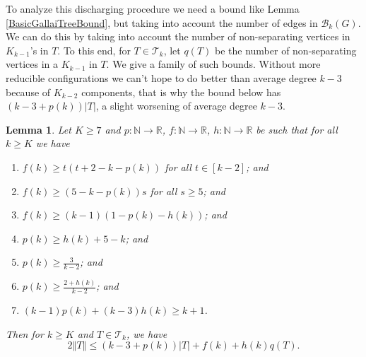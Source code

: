 \documentclass[12pt]{article}
\theoremstyle{plain}
\newtheorem{lem}[thm]{Lemma}
\theoremstyle{definition}
\theoremstyle{remark}
\newcommand{\fancy}[1]{\mathcal{#1}}
\newcommand{\IN}{\mathbb{N}}
\newcommand{\IR}{\mathbb{R}}
\newcommand{\T}{\fancy{T}}
\newcommand{\B}{\fancy{B}}
\newcommand{\card}[1]{\left|#1\right|}
\newcommand{\size}[1]{\left\Vert#1\right\Vert}
\newcommand{\func}[3]{#1\colon #2 \rightarrow #3}
\newcommand{\irange}[1]{\left[#1\right]}
\begin{document}
To analyze this discharging procedure we need a bound like Lemma \ref{BasicGallaiTreeBound}, but taking into account the number of edges in $\B_k(G)$.  We can do this by taking into account the number of non-separating vertices in $K_{k-1}$'s in $T$.  To this end, for $T \in \T_k$, let $q(T)$ be the number of non-separating vertices in a $K_{k-1}$ in $T$.  We give a family of such bounds.  Without more reducible configurations we can't hope to do better than average degree $k-3$ because of $K_{k-2}$ components, that is why the bound below has $(k-3 + p(k))|T|$, a slight worsening of average degree $k-3$.

\begin{lem}\label{BoundFamily}
	Let $K \ge 7$ and $\func{p}{\IN}{\IR}$, $\func{f}{\IN}{\IR}$, $\func{h}{\IN}{\IR}$ be such that for all $k \ge K$ we have
	\begin{enumerate}
		\item $f(k) \ge t(t+2-k-p(k))$ for all $t \in \irange{k-2}$; and
    	\item $f(k) \ge (5-k-p(k))s$ for all $s \ge 5$; and
		\item $f(k) \ge (k-1)(1- p(k) - h(k))$; and	
		\item $p(k) \ge h(k) + 5 - k$; and
		\item $p(k) \ge \frac{3}{k-2}$; and
		\item $p(k) \ge \frac{2+h(k)}{k-2}$; and
		\item $(k-1)p(k) + (k-3)h(k) \ge k+1$.
	\end{enumerate}
	Then for $k \ge K$ and $T \in \T_k$, we have
	\[2\size{T} \le (k-3 + p(k))\card{T} + f(k) + h(k)q(T).\]
\end{lem}
\end{document}
